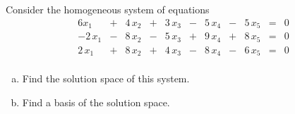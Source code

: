 
\begin{exerciseStatement}


Consider the homogeneous system of equations 
\begin{alignat*}{6} x_{1} &+& 4 \, x_{2} &+& 3 \, x_{3} &-& 5 \, x_{4} &-& 5 \, x_{5} &=& 0 \\-2 \, x_{1} &-& 8 \, x_{2} &-& 5 \, x_{3} &+& 9 \, x_{4} &+& 8 \, x_{5} &=& 0 \\2 \, x_{1} &+& 8 \, x_{2} &+& 4 \, x_{3} &-& 8 \, x_{4} &-& 6 \, x_{5} &=& 0 \\ \end{alignat*}
            


\begin{enumerate}[(a)]
\item  Find the solution space of this system.
\item  Find a basis of the solution space.
\end{enumerate}
    
\end{exerciseStatement}
    
